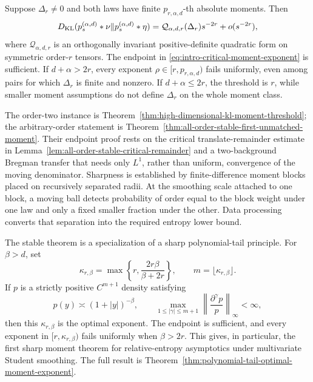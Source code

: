 \begin{unnumberedtheorem}
Suppose \(\Delta_r\ne0\) and both laws have finite
\(p_{r,\alpha,d}\)-th absolute moments.  Then
\[
 D_{\rm KL}(p_s^{(\alpha,d)}*\nu\|p_s^{(\alpha,d)}*\eta)
 =\mathcal Q_{\alpha,d,r}(\Delta_r)s^{-2r}+o(s^{-2r}),
\]
where \(\mathcal Q_{\alpha,d,r}\) is an orthogonally invariant
positive-definite quadratic form on symmetric order-\(r\) tensors.  The
endpoint in \eqref{eq:intro-critical-moment-exponent} is sufficient.  If
\(d+\alpha>2r\), every exponent
\(\rho\in[r,p_{r,\alpha,d})\) fails uniformly, even among pairs for which
\(\Delta_r\) is finite and nonzero.  If \(d+\alpha\le2r\), the threshold is
\(r\), while smaller moment assumptions do not define \(\Delta_r\) on the
whole moment class.
\end{unnumberedtheorem}

The order-two instance is
Theorem~\ref{thm:high-dimensional-kl-moment-threshold}; the arbitrary-order
statement is Theorem~\ref{thm:all-order-stable-first-unmatched-moment}.
Their endpoint proof rests on the critical translate-remainder estimate in
Lemma~\ref{lem:all-order-stable-critical-remainder} and a two-background
Bregman transfer that needs only \(L^1\), rather than uniform, convergence of
the moving denominator.  Sharpness is established by finite-difference
moment blocks placed on recursively separated radii.  At the smoothing scale
attached to one block, a moving ball detects probability of order equal to
the block weight under one law and only a fixed smaller fraction under the
other.  Data processing converts that separation into the required entropy
lower bound.

The stable theorem is a specialization of a sharp polynomial-tail principle.
For \(\beta>d\), set
\[
 \kappa_{r,\beta}=\max\left\{r,\frac{2r\beta}{\beta+2r}\right\},
 \qquad m=\lfloor\kappa_{r,\beta}\rfloor.
\]
If \(p\) is a strictly positive \(C^{m+1}\) density satisfying
\[
 p(y)\asymp(1+|y|)^{-\beta},\qquad
 \max_{1\le|\gamma|\le m+1}
 \left\|\frac{\partial^\gamma p}{p}\right\|_\infty<\infty,
\]
then this \(\kappa_{r,\beta}\) is the optimal exponent.
The endpoint is sufficient, and every exponent in
\([r,\kappa_{r,\beta})\) fails uniformly when \(\beta>2r\).  This gives, in
particular, the first sharp moment theorem for relative-entropy asymptotics
under multivariate Student smoothing.  The full result is
Theorem~\ref{thm:polynomial-tail-optimal-moment-exponent}.

